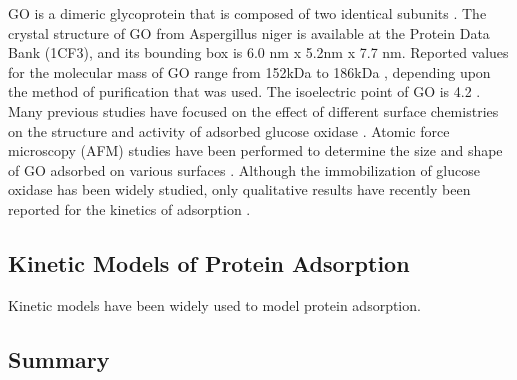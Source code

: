 GO is a dimeric glycoprotein that is composed of two identical subunits
\cite{Wohlfahrt1999}. The crystal structure of GO from Aspergillus
niger is available at the Protein Data Bank (1CF3), and its bounding
box is 6.0 nm x 5.2nm x 7.7 nm. Reported values for the molecular
mass of GO range from 152kDa \cite{Keilin1948} to 186kDa \cite{Swoboda1965},
depending upon the method of purification that was used. The isoelectric
point of GO is 4.2 \cite{Pazur1964}. Many previous studies have focused
on the effect of different surface chemistries on the structure and
activity of adsorbed glucose oxidase \cite{Fears2009,Dong1997}. Atomic
force microscopy (AFM) studies have been performed to determine the
size and shape of GO adsorbed on various surfaces \cite{Muguruma2006,Otsuka2004}.
Although the immobilization of glucose oxidase has been widely studied,
only qualitative results have recently been reported for the kinetics
of adsorption \cite{Muguruma2006}.


\subsection{Kinetic Models of Protein Adsorption}

Kinetic models have been widely used to model protein adsorption.


\subsection{Summary}

